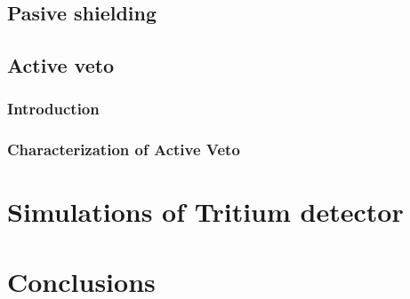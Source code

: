 \documentclass[12pt,a4paper]{book}
\begin{document}
	\section{Pasive shielding}
		\newpage
		
	\section{Active veto}
		\subsection{Introduction}
		\newpage
		
		\subsection{Characterization of Active Veto}
		\newpage
			
		
\chapter{Simulations of Tritium detector}  \label{chap:Simulations}
\newpage

\chapter{Conclusions}  \label{chap:Conclusions}
\newpage



%
	
\end{document}
